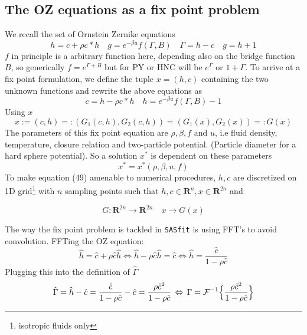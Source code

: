 \documentclass[11pt,a4paper]{article}
\begin{document}
\subsection{The OZ equations as a fix point problem}
We recall the set of Ornstein Zernike equations
\begin{equation}
h = c + \rho c*h \quad g = e^{-\beta u} f(\Gamma, B) \quad \Gamma = h -c \quad g = h+1
\end{equation}
$f$ in principle is a arbitrary function here, depending also on the bridge function $B$, so generically
$f = e^{\Gamma + B}$ but for PY or HNC will be $e^{\Gamma}$ or $1+ \Gamma$.
To arrive at a fix point formulation, we define the tuple $x = (h,c)$ containing the two unknown functions and rewrite the above equations as
\begin{equation}
c = h - \rho c*h \quad h = e^{-\beta u} f(\Gamma, B) -1
\end{equation}
Using $x$ 
\begin{equation}
x := (c,h) =: (G_1(c,h), G_2(c,h)) = (G_1(x), G_2(x)) =: G(x)
\end{equation}
The parameters of this fix point equation are $\rho, \beta, f$ and $u$, i.e fluid density, temperature, closure relation and two-particle potential.
(Particle diameter for a hard sphere potential). So a solution $x^{*}$ is dependent on these parameters
\begin{equation}
x^{*} = x^{*}(\rho, \beta, u,f)
\end{equation}
To make equation (49) amenable to numerical procedures, $h,c$ are discretized on 1D grid\footnote{isotropic fluids only}
with $n$ sampling points such that $h,c \in \mathbf{R}^{n}, x \in \mathbf{R}^{2n}$ and

\begin{equation}
G: \mathbf{R}^{2n} \rightarrow \mathbf{R}^{2n} \quad x \rightarrow G(x)
\end{equation}

The way the fix point problem is tackled in \texttt{SASfit} is using FFT's to avoid convolution. FFTing the OZ equation:
\begin{equation}
\hat h = \hat c + \rho \hat c \hat h \Leftrightarrow
\hat h - \rho \hat c \hat h = \hat c \Leftrightarrow
\hat h = \frac{\hat c}{1 - \rho \hat c}
\end{equation}
Plugging this into the definition of $\hat \Gamma$
\begin{equation}
\hat \Gamma = \hat h - \hat c =
\frac{\hat c}{1 - \rho \hat c} - \hat c =
\frac{\rho \hat c^{2}}{1 - \rho \hat c}
\, \Leftrightarrow \,
\Gamma =  \mathcal{F}^{-1} 
\Bigl\{
\frac{\rho \hat c^{2}}{1 - \rho \hat c}
\Bigr\}
\end{equation}
\end{document}
